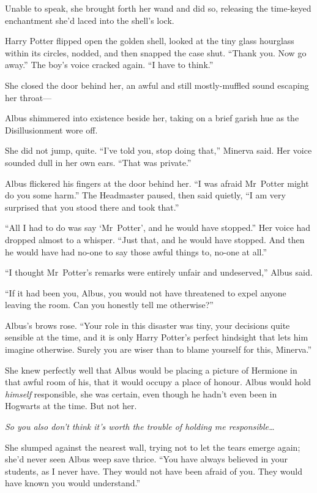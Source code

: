 Unable to speak, she brought forth her wand and did so, releasing the time-keyed enchantment she’d laced into the shell’s lock.

Harry Potter flipped open the golden shell, looked at the tiny glass hourglass within its circles, nodded, and then snapped the case shut. “Thank you. Now go away.” The boy’s voice cracked again. “I have to think.”

\later

She closed the door behind her, an awful and still mostly-muffled sound escaping her throat—

Albus shimmered into existence beside her, taking on a brief garish hue as the Disillusionment wore off.

She did not jump, quite. “I’ve told you, stop doing that,” Minerva said. Her voice sounded dull in her own ears. “That was private.”

Albus flickered his fingers at the door behind her. “I was afraid Mr~Potter might do you some harm.” The Headmaster paused, then said quietly, “I am very surprised that you stood there and took that.”

“All I had to do was say ‘Mr~Potter’, and he would have stopped.” Her voice had dropped almost to a whisper. “Just that, and he would have stopped. And then he would have had no-one to say those awful things to, no-one at all.”

“I thought Mr~Potter’s remarks were entirely unfair and undeserved,” Albus said.

“If it had been you, Albus, you would not have threatened to expel anyone leaving the room. Can you honestly tell me otherwise?”

Albus’s brows rose. “Your role in this disaster was tiny, your decisions quite sensible at the time, and it is only Harry Potter’s perfect hindsight that lets him imagine otherwise. Surely you are wiser than to blame yourself for this, Minerva.”

She knew perfectly well that Albus would be placing a picture of Hermione in that awful room of his, that it would occupy a place of honour. Albus would hold \emph{himself} responsible, she was certain, even though he hadn’t even been in Hogwarts at the time. But not her.

\emph{So you also don’t think it’s worth the trouble of holding me responsible…}

She slumped against the nearest wall, trying not to let the tears emerge again; she’d never seen Albus weep save thrice. “You have always believed in your students, as I never have. They would not have been afraid of you. They would have known you would understand.”

